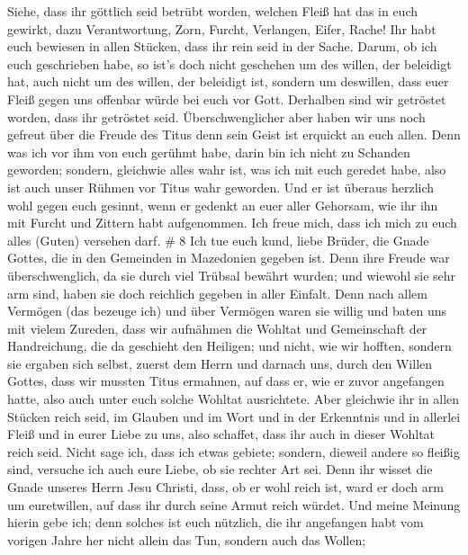 Siehe, dass ihr göttlich seid betrübt worden, welchen
Fleiß hat das in euch gewirkt, dazu Verantwortung, Zorn, Furcht,
Verlangen, Eifer, Rache! Ihr habt euch bewiesen in allen Stücken, dass
ihr rein seid in der Sache.  Darum, ob ich euch geschrieben
habe, so ist's doch nicht geschehen um des willen, der beleidigt hat,
auch nicht um des willen, der beleidigt ist, sondern um deswillen, dass
euer Fleiß gegen uns offenbar würde bei euch vor Gott. 
Derhalben sind wir getröstet worden, dass ihr getröstet seid.
Überschwenglicher aber haben wir uns noch gefreut über die Freude des
Titus denn sein Geist ist erquickt an euch allen.  Denn was
ich vor ihm von euch gerühmt habe, darin bin ich nicht zu Schanden
geworden; sondern, gleichwie alles wahr ist, was ich mit euch geredet
habe, also ist auch unser Rühmen vor Titus wahr geworden. 
Und er ist überaus herzlich wohl gegen euch gesinnt, wenn er gedenkt an
euer aller Gehorsam, wie ihr ihn mit Furcht und Zittern habt
aufgenommen.  Ich freue mich, dass ich mich zu euch alles
(Guten) versehen darf. \# 8  Ich tue euch kund, liebe
Brüder, die Gnade Gottes, die in den Gemeinden in Mazedonien gegeben
ist.  Denn ihre Freude war überschwenglich, da sie durch
viel Trübsal bewährt wurden; und wiewohl sie sehr arm sind, haben sie
doch reichlich gegeben in aller Einfalt.  Denn nach allem
Vermögen (das bezeuge ich) und über Vermögen waren sie willig
 und baten uns mit vielem Zureden, dass wir aufnähmen die
Wohltat und Gemeinschaft der Handreichung, die da geschieht den
Heiligen;  und nicht, wie wir hofften, sondern sie ergaben
sich selbst, zuerst dem Herrn und darnach uns, durch den Willen Gottes,
 dass wir mussten Titus ermahnen, auf dass er, wie er zuvor
angefangen hatte, also auch unter euch solche Wohltat ausrichtete.
 Aber gleichwie ihr in allen Stücken reich seid, im Glauben
und im Wort und in der Erkenntnis und in allerlei Fleiß und in eurer
Liebe zu uns, also schaffet, dass ihr auch in dieser Wohltat reich seid.
 Nicht sage ich, dass ich etwas gebiete; sondern, dieweil
andere so fleißig sind, versuche ich auch eure Liebe, ob sie rechter Art
sei.  Denn ihr wisset die Gnade unseres Herrn Jesu Christi,
dass, ob er wohl reich ist, ward er doch arm um euretwillen, auf dass
ihr durch seine Armut reich würdet.  Und meine Meinung
hierin gebe ich; denn solches ist euch nützlich, die ihr angefangen habt
vom vorigen Jahre her nicht allein das Tun, sondern auch das Wollen;
